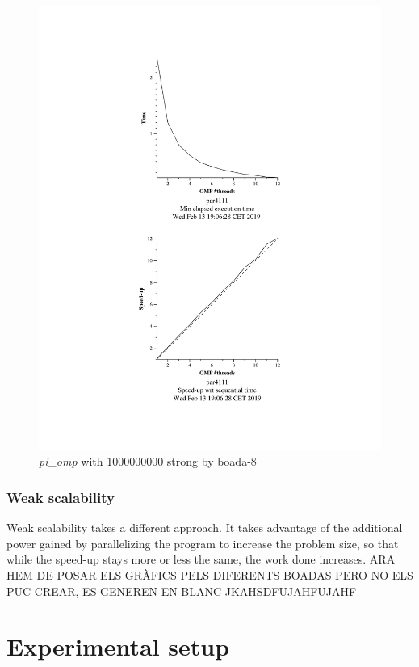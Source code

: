 \documentclass[12]{article}
\begin{document}
\begin{figure}[H]
\centering
\includegraphics[scale=0.5]{pi_omp-1000000000-1-12-3-strong-boada-8.png}
 \caption{ \textit{pi\_omp} with 1000000000 strong by boada-8}
 \label{fig:pi_ompboada8}
\end{figure}

\subsubsection{Weak scalability}

Weak scalability takes a different approach. It takes advantage of the additional power gained by parallelizing the program to increase the problem size, so that while the speed-up stays more or less the same, the work done increases.
ARA HEM DE POSAR ELS GRÀFICS PELS DIFERENTS BOADAS PERO NO ELS PUC CREAR, ES GENEREN EN BLANC JKAHSDFUJAHFUJAHF
\section{Experimental setup}
\end{document}
